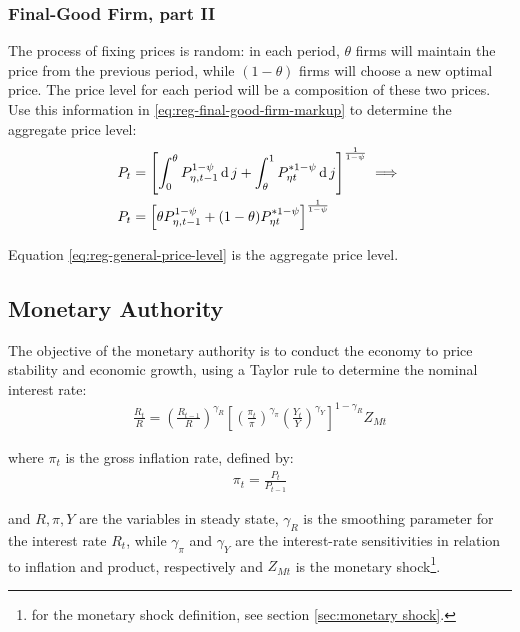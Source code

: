 \documentclass[
	thesis.tex
	]{subfiles}
\begin{document}
\subsubsection{Final-Good Firm, part II}

The process of fixing prices is random: in each period, $\theta$ firms will maintain the price from the previous period, while $(1-\theta)$ firms will choose a new optimal price. The price level for each period will be a composition of these two prices. Use this information in \ref{eq:reg-final-good-firm-markup} to determine the aggregate price level:
\begin{align}
	P_t & = \left[ \int_{0}^{\theta} P_{\eta, t-1}^{1-\psi} \operatorname{d} j + \int_{\theta}^{1} P_{\eta t}^{\ast 1-\psi} \operatorname{d} j \right]^{\frac{1}{1-\psi}}  \implies \nonumber \\
	P_t & = \left[ \theta P_{\eta, t-1}^{1-\psi} + (1-\theta) P_{\eta t}^{\ast 1-\psi} \right]^\frac{1}{1-\psi} \label{eq:reg-general-price-level}
\end{align}

Equation \ref{eq:reg-general-price-level} is the aggregate price level.


\subsection{Monetary Authority}

The objective of the monetary authority is to conduct the economy to price stability and economic growth, using a Taylor rule \cite{taylor_discretion_1993} to determine the nominal interest rate:
\begin{align}
	\label{eq:reg-monetary-policy}
	\frac{R_t}{R} =
	\left( \frac{R_{t-1}}{R} \right)^{\gamma_R}  \left[
	\left( \frac{\pi_t}{\pi} \right)^{\gamma_\pi}
	\left( \frac{Y_t}{Y} \right)^{\gamma_Y} \right]^{1-\gamma_R} Z_{Mt}
\end{align}

where $\pi_t$ is the gross inflation rate, defined by:
\begin{align}
	\pi_t = \frac{P_t}{P_{t-1}}
	\label{eq:reg-gross-inflation-rate}
\end{align}

and $R, \pi, Y$ are the variables in steady state, $\gamma_R$ is the smoothing parameter for the interest rate $R_t$, while $\gamma_\pi$ and $\gamma_Y$ are the interest-rate sensitivities in relation to inflation and product, respectively and $Z_{Mt}$ is the monetary shock\footnote{for the monetary shock definition, see section \ref{sec:monetary shock}.}.
\end{document}
